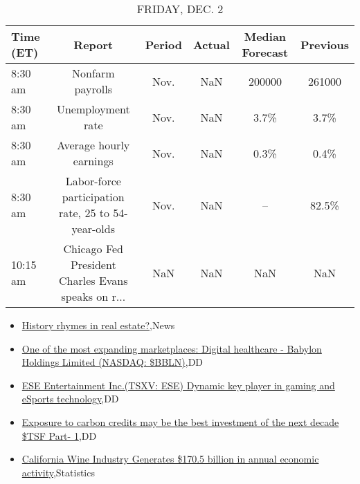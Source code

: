 \documentclass{article}%
\begin{document}
%


\begin{table}[htbp]%
\caption{FRIDAY, DEC. 2}%
\centering%
\begin{adjustbox}{width=1\textwidth}%
\begin{tabular}{lccccc}
\toprule
Time (ET) &                                             Report & Period & Actual & Median Forecast & Previous \\
\midrule
  8:30 am &                                   Nonfarm payrolls &   Nov. &    NaN &          200000 &   261000 \\
  8:30 am &                                  Unemployment rate &   Nov. &    NaN &            3.7\% &     3.7\% \\
  8:30 am &                            Average hourly earnings &   Nov. &    NaN &            0.3\% &     0.4\% \\
  8:30 am & Labor-force participation rate, 25 to 54-year-olds &   Nov. &    NaN &              -- &    82.5\% \\
 10:15 am & Chicago Fed President Charles Evans speaks on r... &    NaN &    NaN &             NaN &      NaN \\
\bottomrule
\end{tabular}
%
\end{adjustbox}%
\end{table}

%
\begin{itemize}%
\item%
\href{https://reddit.com/r/wallstreetbets/comments/zae684/history\_rhymes\_in\_real\_estate/}{History rhymes in real estate?},News%
\item%
\href{https://reddit.com/r/Baystreetbets/comments/za6u6s/one\_of\_the\_most\_expanding\_marketplaces\_digital/}{One of the most expanding marketplaces: Digital healthcare - Babylon Holdings Limited (NASDAQ: \$BBLN)},DD%
\item%
\href{https://reddit.com/r/Baystreetbets/comments/z9qn0f/ese\_entertainment\_inctsxv\_ese\_dynamic\_key\_player/}{ESE Entertainment Inc.(TSXV: ESE) Dynamic key player in gaming and eSports technology},DD%
\item%
\href{https://reddit.com/r/Baystreetbets/comments/z8yswd/exposure\_to\_carbon\_credits\_may\_be\_the\_best/}{Exposure to carbon credits may be the best investment of the next decade \$TSF Part- 1},DD%
\item%
\href{https://reddit.com/r/Economics/comments/za4js5/california\_wine\_industry\_generates\_1705\_billion/}{California Wine Industry Generates \$170.5 billion in annual economic activity},Statistics%
\end{itemize}%
\end{document}
